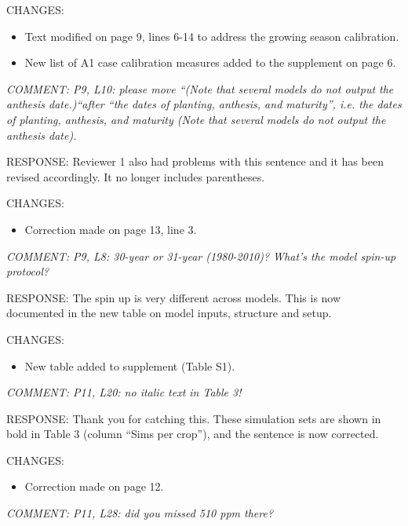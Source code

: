 \documentclass[gmd, manuscript]{copernicus} %
\begin{document}
CHANGES:
\begin{itemize}
    \item Text modified on page 9, lines 6-14 to address the growing season calibration.
    \item New list of A1 case calibration measures added to the supplement on page 6.
\end{itemize}

\smallskip

\textcolor{dark-gray}{\textit{COMMENT: P9, L10: please move “(Note that several models do not output the anthesis date.)“after “the dates of planting, anthesis, and maturity”, i.e. the dates of planting, anthesis, and maturity (Note that several models do not output the anthesis date).}}

RESPONSE: Reviewer 1 also had problems with this sentence and it has been revised accordingly. It no longer includes parentheses.
\smallskip

CHANGES:
\begin{itemize}
    \item Correction made on page 13, line 3.
\end{itemize}

\smallskip

\textcolor{dark-gray}{\textit{COMMENT: P9, L8: 30-year or 31-year (1980-2010)? What’s the model spin-up protocol?}}

RESPONSE: The spin up is very different across models. This is now documented in the new table on model inputs, structure and setup.
\smallskip

CHANGES:
\begin{itemize}
    \item New table added to supplement (Table S1).
\end{itemize}

\smallskip

\textcolor{dark-gray}{\textit{COMMENT: P11, L20: no italic text in Table 3!}}

RESPONSE: Thank you for catching this. These simulation sets are shown in bold in Table 3 (column “Sims per crop”), and the sentence is now corrected.
\smallskip

CHANGES:
\begin{itemize}
    \item Correction made on page 12.
\end{itemize}

\smallskip

\textcolor{dark-gray}{\textit{COMMENT: P11, L28: did you missed 510 ppm there?}}
\end{document}
